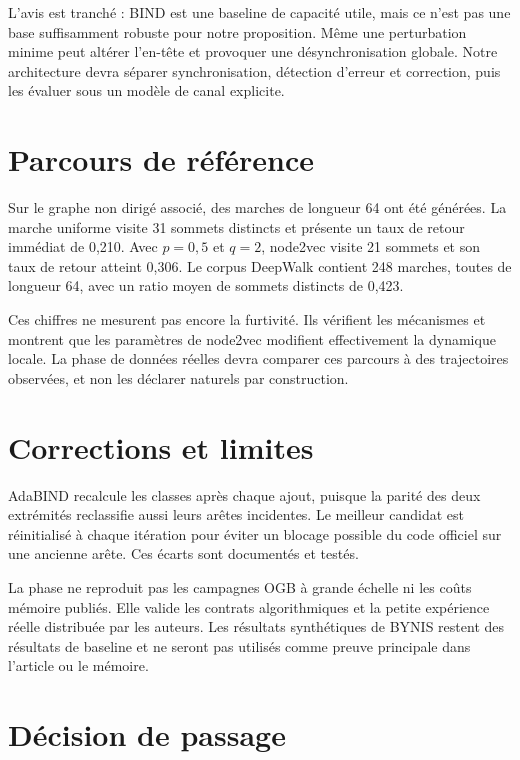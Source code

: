 \documentclass[10pt,a4paper]{article}
\begin{document}
L'avis est tranché : BIND est une baseline de capacité utile, mais ce n'est
pas une base suffisamment robuste pour notre proposition. Même une
perturbation minime peut altérer l'en-tête et provoquer une désynchronisation
globale. Notre architecture devra séparer synchronisation, détection d'erreur
et correction, puis les évaluer sous un modèle de canal explicite.

\section{Parcours de référence}

Sur le graphe non dirigé associé, des marches de longueur 64 ont été générées.
La marche uniforme visite 31 sommets distincts et présente un taux de retour
immédiat de 0,210. Avec \(p=0,5\) et \(q=2\), node2vec visite 21 sommets et son
taux de retour atteint 0,306. Le corpus DeepWalk contient 248 marches, toutes
de longueur 64, avec un ratio moyen de sommets distincts de 0,423.

Ces chiffres ne mesurent pas encore la furtivité. Ils vérifient les mécanismes
et montrent que les paramètres de node2vec modifient effectivement la
dynamique locale. La phase de données réelles devra comparer ces parcours à
des trajectoires observées, et non les déclarer naturels par construction.

\section{Corrections et limites}

AdaBIND recalcule les classes après chaque ajout, puisque la parité des deux
extrémités reclassifie aussi leurs arêtes incidentes. Le meilleur candidat est
réinitialisé à chaque itération pour éviter un blocage possible du code
officiel sur une ancienne arête. Ces écarts sont documentés et testés.

La phase ne reproduit pas les campagnes OGB à grande échelle ni les coûts
mémoire publiés. Elle valide les contrats algorithmiques et la petite
expérience réelle distribuée par les auteurs. Les résultats synthétiques de
BYNIS restent des résultats de baseline et ne seront pas utilisés comme preuve
principale dans l'article ou le mémoire.

\section{Décision de passage}
\end{document}
